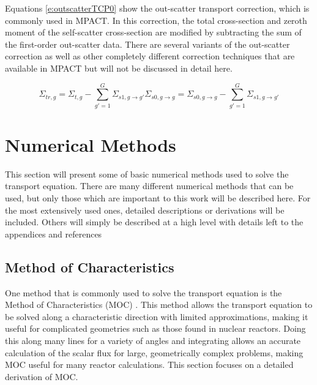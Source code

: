 Equations \ref{e:outscatterTCP0} show the out-scatter transport correction, which is commonly used in MPACT.  In this correction, the total cross-section and zeroth moment of the self-scatter cross-section are modified by subtracting the sum of the first-order out-scatter data.  There are several variants of the out-scatter correction as well as other completely different correction techniques \cite{StimpsonAP1000ImprovedDiffCoeffs2015} that are available in MPACT but will not be discussed in detail here.

\begin{subequations}\label{e:outscatterTCP0}
\begin{equation}
\Sigma_{tr,g} = \Sigma_{t,g} - \sum_{g'=1}^G \Sigma_{s1,g\rightarrow g'}
\end{equation}
\begin{equation}
\Sigma_{s0,g\rightarrow g} = \Sigma_{s0,g\rightarrow g} - \sum_{g'=1}^G \Sigma_{s1,g\rightarrow g'}
\end{equation}
\end{subequations}

\section{Numerical Methods}

This section will present some of basic numerical methods used to solve the transport equation.  There are many different numerical methods that can be used, but only those which are important to this work will be described here.  For the most extensively used ones, detailed descriptions or derivations will be included.  Others will simply be described at a high level with details left to the appendices and references

\subsection{Method of Characteristics}\label{ss:MOCtheory}

One method that is commonly used to solve the transport equation is the Method of Characteristics (MOC) \cite{AskerMOCOrig1972,HalsallMOCOrigCACTUS1980}.  This method allows the transport equation to be solved along a characteristic direction with limited approximations, making it useful for complicated geometries such as those found in nuclear reactors.  Doing this along many lines for a variety of angles and integrating allows an accurate calculation of the scalar flux for large, geometrically complex problems, making MOC useful for many reactor calculations.  This section focuses on a detailed derivation of MOC.

